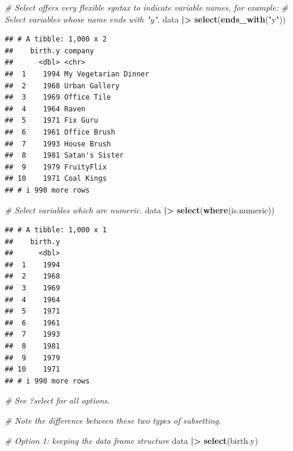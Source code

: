 \documentclass[
]{book}
\newenvironment{Shaded}{\begin{snugshade}}{\end{snugshade}}
\newcommand{\CommentTok}[1]{\textcolor[rgb]{0.56,0.35,0.01}{\textit{#1}}}
\newcommand{\FunctionTok}[1]{\textcolor[rgb]{0.13,0.29,0.53}{\textbf{#1}}}
\newcommand{\NormalTok}[1]{#1}
\newcommand{\SpecialCharTok}[1]{\textcolor[rgb]{0.81,0.36,0.00}{\textbf{#1}}}
\newcommand{\StringTok}[1]{\textcolor[rgb]{0.31,0.60,0.02}{#1}}
\begin{document}
\begin{Shaded}
\begin{Highlighting}[]
\CommentTok{\# Select offers very flexible syntax to indicate variable names, for example:}
\CommentTok{\# Select variables whose name ends with "y".}
\NormalTok{data }\SpecialCharTok{|\textgreater{}} 
  \FunctionTok{select}\NormalTok{(}\FunctionTok{ends\_with}\NormalTok{(}\StringTok{"y"}\NormalTok{))}
\end{Highlighting}
\end{Shaded}

\begin{verbatim}
## # A tibble: 1,000 x 2
##    birth.y company             
##      <dbl> <chr>               
##  1    1994 My Vegetarian Dinner
##  2    1968 Urban Gallery       
##  3    1969 Office Tile         
##  4    1964 Raven               
##  5    1971 Fix Guru            
##  6    1961 Office Brush        
##  7    1993 House Brush         
##  8    1981 Satan's Sister      
##  9    1979 FruityFlix          
## 10    1971 Coal Kings          
## # i 990 more rows
\end{verbatim}

\begin{Shaded}
\begin{Highlighting}[]
\CommentTok{\# Select variables which are numeric.}
\NormalTok{data }\SpecialCharTok{|\textgreater{}} 
  \FunctionTok{select}\NormalTok{(}\FunctionTok{where}\NormalTok{(is.numeric))}
\end{Highlighting}
\end{Shaded}

\begin{verbatim}
## # A tibble: 1,000 x 1
##    birth.y
##      <dbl>
##  1    1994
##  2    1968
##  3    1969
##  4    1964
##  5    1971
##  6    1961
##  7    1993
##  8    1981
##  9    1979
## 10    1971
## # i 990 more rows
\end{verbatim}

\begin{Shaded}
\begin{Highlighting}[]
\CommentTok{\# See ?select for all options.}

\CommentTok{\# Note the difference between these two types of subsetting.}

\CommentTok{\# Option 1: keeping the data frame structure}
\NormalTok{data }\SpecialCharTok{|\textgreater{}} 
  \FunctionTok{select}\NormalTok{(birth.y)}
\end{Highlighting}
\end{Shaded}
\end{document}
